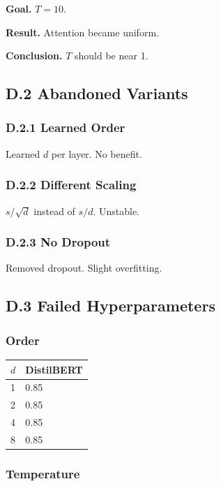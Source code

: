 \textbf{Goal.} $T = 10$.

\textbf{Result.} Attention became uniform.

\textbf{Conclusion.} $T$ should be near 1.

\subsection{D.2 Abandoned Variants}

\subsubsection{D.2.1 Learned Order}

Learned $d$ per layer. No benefit.

\subsubsection{D.2.2 Different Scaling}

$s / \sqrt{d}$ instead of $s / d$. Unstable.

\subsubsection{D.2.3 No Dropout}

Removed dropout. Slight overfitting.

\subsection{D.3 Failed Hyperparameters}

\subsubsection{Order}

\begin{table}[H]
\centering
\small
\begin{tabular}{ll}
\toprule
\textbf{$d$} & \textbf{DistilBERT} \\
\midrule
1 & 0.85 \\
2 & 0.85 \\
4 & 0.85 \\
8 & 0.85 \\
\bottomrule
\end{tabular}
\end{table}

\subsubsection{Temperature}

